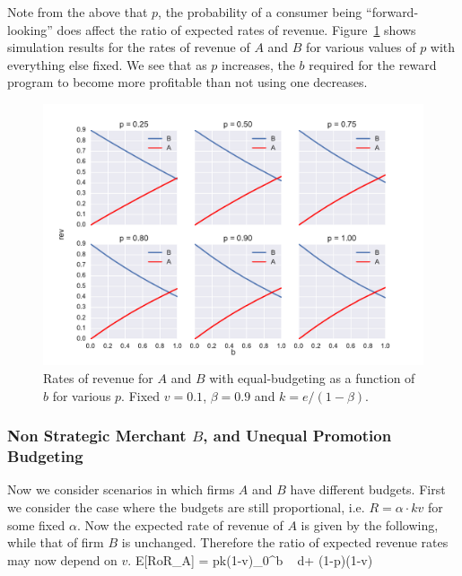 Note from the above that $p$, the probability of a consumer being ``forward-looking'' does affect the ratio of expected rates of revenue. Figure~\ref{fig:eq_budg_vary_p} shows simulation results for the rates of revenue of $A$ and $B$ for various values of $p$ with everything else fixed. We see that as $p$ increases, the $b$ required for the reward program to become more profitable than not using one decreases.

\begin{figure}[h!]
\begin{centering}
\includegraphics[scale = 0.75]{./figures/eq_budg_vary_p_v01.pdf}
\caption{Rates of revenue for $A$ and $B$ with equal-budgeting as a function of $b$ for various $p$. Fixed $v = 0.1$, $\beta = 0.9$ and $k = e/(1-\beta)$.}
\label{fig:eq_budg_vary_p}
\end{centering}
\end{figure}

\subsubsection{Non Strategic Merchant $B$, and Unequal Promotion Budgeting}

Now we consider scenarios in which firms $A$ and $B$ have different budgets. First we consider the case where the budgets are still proportional, i.e. $R = \alpha \cdot kv$ for some fixed $\alpha$. Now the expected rate of revenue of $A$ is given by the following, while that of firm $B$ is unchanged. Therefore the ratio of expected revenue rates may now depend on $v$.
\beq
{}E[RoR_A] = pk(1-\alpha v)\int_0^b  \mbox{ } d\lambda + (1-p)(1-\alpha v)
\eeq

